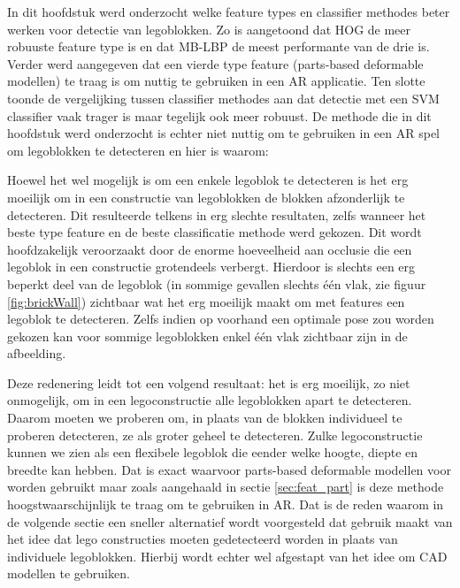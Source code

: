 In dit hoofdstuk werd onderzocht welke feature types en classifier methodes beter werken voor detectie van legoblokken. Zo is aangetoond dat HOG de meer robuuste feature type is en dat MB-LBP de meest performante van de drie is. Verder werd aangegeven dat een vierde type feature (parts-based deformable modellen) te traag is om nuttig te gebruiken in een AR applicatie. Ten slotte toonde de vergelijking tussen classifier methodes aan dat detectie met een SVM classifier vaak trager is maar tegelijk ook meer robuust. De methode die in dit hoofdstuk werd onderzocht is echter niet nuttig om te gebruiken in een AR spel om legoblokken te detecteren en hier is waarom:

Hoewel het wel mogelijk is om een enkele legoblok te detecteren is het erg moeilijk om in een constructie van legoblokken de blokken afzonderlijk te detecteren. Dit resulteerde telkens in erg slechte resultaten, zelfs wanneer het beste type feature en de beste classificatie methode werd gekozen. Dit wordt hoofdzakelijk veroorzaakt door de enorme hoeveelheid aan occlusie die een legoblok in een constructie grotendeels verbergt. Hierdoor is slechts een erg beperkt deel van de legoblok (in sommige gevallen slechts \'e\'en vlak, zie figuur \ref{fig:brickWall}) zichtbaar wat het erg moeilijk maakt om met features een legoblok te detecteren. Zelfs indien op voorhand een optimale pose zou worden gekozen kan voor sommige legoblokken enkel \'e\'en vlak zichtbaar zijn in de afbeelding.

Deze redenering leidt tot een volgend resultaat: het is erg moeilijk, zo niet onmogelijk, om in een legoconstructie alle legoblokken apart te detecteren. Daarom moeten we proberen om, in plaats van de blokken individueel te proberen detecteren, ze als groter geheel te detecteren. Zulke legoconstructie kunnen we zien als een flexibele legoblok die eender welke hoogte, diepte en breedte kan hebben. Dat is exact waarvoor parts-based deformable modellen voor worden gebruikt maar zoals aangehaald in sectie \ref{sec:feat_part} is deze methode hoogstwaarschijnlijk te traag om te gebruiken in AR. Dat is de reden waarom in de volgende sectie een sneller alternatief wordt voorgesteld dat gebruik maakt van het idee dat lego constructies moeten gedetecteerd worden in plaats van individuele legoblokken. Hierbij wordt echter wel afgestapt van het idee om CAD modellen te gebruiken.


